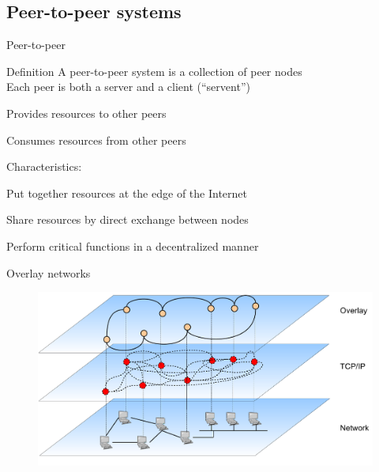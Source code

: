 \subsection{Peer-to-peer systems}

\begin{frame}{Peer-to-peer}
\begin{block}{Definition}
A peer-to-peer system is a collection of peer nodes  \\
Each peer is both a server and a client (“servent”)
\BI
\item Provides resources to other peers
\item Consumes resources from other peers
\EI
\end{block}

\bigskip
Characteristics:
\BI
\item Put together resources at the edge of the Internet
\item Share resources by direct exchange between nodes
\item Perform critical functions in a decentralized manner
\EI
\end{frame}

\begin{frame}{Overlay networks}
\begin{figure}
	\includegraphics[width=\textwidth]{figs/10/overlay}
\end{figure}
\end{frame}

